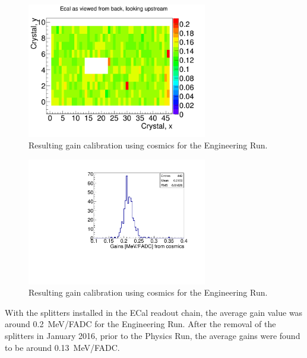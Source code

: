 \begin{figure}[H]
  \centering
      \includegraphics[width=0.7\textwidth]{pics/performance/cosmicGains2015.png}
  \caption[Resulting 2015 gain calibration in the ECal using cosmic ray muons shown by ECal module position]{Resulting gain calibration using cosmics for the Engineering Run.}
  \label{Figure:cosmicG}
\end{figure}


\begin{figure}[H]
  \centering
      \includegraphics[width=0.7\textwidth]{pics/performance/cosmicGainsMay15.pdf}
  \caption[Distribution of the resulting 2015 gains in the ECal using cosmic ray muons]{Resulting gain calibration using cosmics for the Engineering Run.}
  \label{Figure:cosmicGhisto}
\end{figure}

With the splitters installed in the ECal readout chain, the average gain value was around 0.2~MeV/FADC for the Engineering Run. After the removal of the splitters in January 2016, prior to the Physics Run, the average gains were found to be around 0.13~MeV/FADC.
